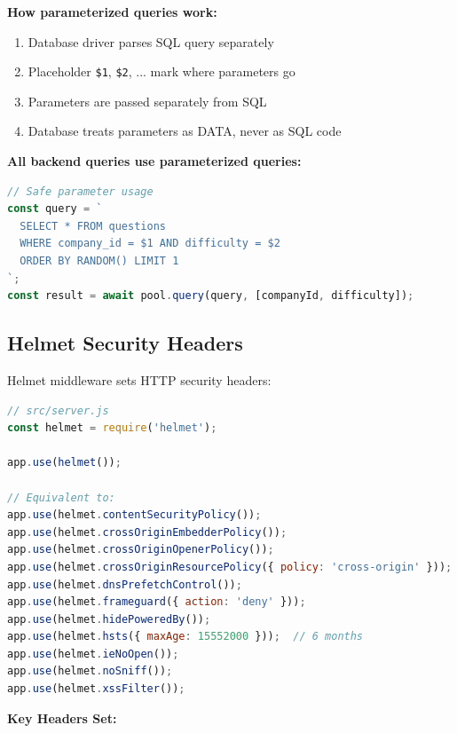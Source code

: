 \documentclass[12pt,a4paper,oneside]{article}
\begin{document}
\textbf{How parameterized queries work:}

\begin{enumerate}
    \item Database driver parses SQL query separately
    \item Placeholder \texttt{\$1}, \texttt{\$2}, ... mark where parameters go
    \item Parameters are passed separately from SQL
    \item Database treats parameters as DATA, never as SQL code
\end{enumerate}

\textbf{All backend queries use parameterized queries:}

\begin{lstlisting}[language=JavaScript, caption=Example from interviewController]
// Safe parameter usage
const query = `
  SELECT * FROM questions 
  WHERE company_id = $1 AND difficulty = $2 
  ORDER BY RANDOM() LIMIT 1
`;
const result = await pool.query(query, [companyId, difficulty]);
\end{lstlisting}

\subsection{Helmet Security Headers}

Helmet middleware sets HTTP security headers:

\begin{lstlisting}[language=JavaScript, caption=Helmet Configuration]
// src/server.js
const helmet = require('helmet');

app.use(helmet());

// Equivalent to:
app.use(helmet.contentSecurityPolicy());
app.use(helmet.crossOriginEmbedderPolicy());
app.use(helmet.crossOriginOpenerPolicy());
app.use(helmet.crossOriginResourcePolicy({ policy: 'cross-origin' }));
app.use(helmet.dnsPrefetchControl());
app.use(helmet.frameguard({ action: 'deny' }));
app.use(helmet.hidePoweredBy());
app.use(helmet.hsts({ maxAge: 15552000 }));  // 6 months
app.use(helmet.ieNoOpen());
app.use(helmet.noSniff());
app.use(helmet.xssFilter());
\end{lstlisting}

\textbf{Key Headers Set:}
\end{document}
